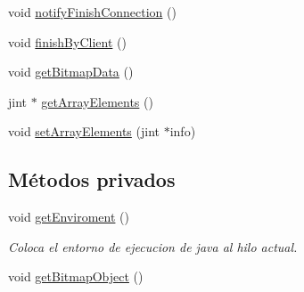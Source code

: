 \begin{DoxyCompactItemize}
\item 
void \hyperlink{classObservableJNI_a5356d8a9177f5ebc4c9d7d583a68b345}{notify\-Finish\-Connection} ()
\item 
void \hyperlink{classObservableJNI_a912cb33f317c7c875ee85f9ccf9a8a4d}{finish\-By\-Client} ()
\item 
void \hyperlink{classObservableJNI_a14bee04164981b0ff38500d041bbaa61}{get\-Bitmap\-Data} ()
\item 
jint $\ast$ \hyperlink{classObservableJNI_a5b072bd86c5e832a794d812f9567dca3}{get\-Array\-Elements} ()
\item 
void \hyperlink{classObservableJNI_a5d5d9b84e308f3ea3f2c6ec3bc49f2d1}{set\-Array\-Elements} (jint $\ast$info)
\end{DoxyCompactItemize}
\subsection*{Métodos privados}
\begin{DoxyCompactItemize}
\item 
void \hyperlink{classObservableJNI_aa585114e66e7531e738a0be9669bceab}{get\-Enviroment} ()
\begin{DoxyCompactList}\small\item\em Coloca el entorno de ejecucion de java al hilo actual. \end{DoxyCompactList}\item 
void \hyperlink{classObservableJNI_a9eb441b7fa11d3e743036264b1cc1549}{get\-Bitmap\-Object} ()
\end{DoxyCompactItemize}
